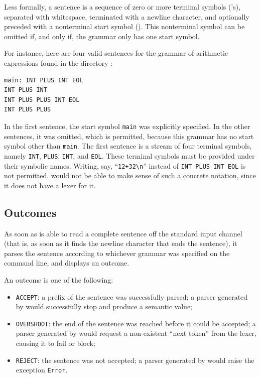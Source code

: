 \documentclass[onecolumn,11pt,nocopyrightspace,preprint]{sigplanconf}
\begin{document}
Less formally, a sentence is a sequence of zero or more terminal symbols
('s), separated with whitespace, terminated with a newline character,
and optionally preceded with a nonterminal start symbol (). This
nonterminal symbol can be omitted if, and only if, the grammar only has one
start symbol.

For instance, here are four valid sentences for the grammar of arithmetic
expressions found in the directory :
%
\begin{verbatim}
main: INT PLUS INT EOL
INT PLUS INT
INT PLUS PLUS INT EOL
INT PLUS PLUS
\end{verbatim}
%
In the first sentence, the start symbol \texttt{main} was explicitly
specified. In the other sentences, it was omitted, which is permitted, because
this grammar has no start symbol other than \texttt{main}.  The first sentence
is a stream of four terminal symbols, namely \texttt{INT}, \texttt{PLUS},
\texttt{INT}, and \texttt{EOL}. These terminal symbols must be provided under
their symbolic names. Writing, say, ``\texttt{12+32\textbackslash n}'' instead
of \texttt{INT PLUS INT EOL} is not permitted. \menhir would not be able to
make sense of such a concrete notation, since it does not have a lexer for it.


\subsection{Outcomes}
\label{sec:outcomes}

As soon as \menhir is able to read a complete sentence off the standard input
channel (that is, as soon as it finds the newline character that ends the
sentence), it parses the sentence according to whichever grammar was specified
on the command line, and displays an outcome.

An outcome is one of the following:
\begin{itemize}
\item \texttt{ACCEPT}: a prefix of the sentence was successfully parsed;
      a parser generated by \menhir would successfully stop and produce
      a semantic value;
\item \texttt{OVERSHOOT}: the end of the sentence was reached before it
      could be accepted; a parser generated by \menhir would request a
      non-existent ``next token'' from the lexer, causing it to fail or
      block;
\item \texttt{REJECT}: the sentence was not accepted; a parser generated
      by \menhir would raise the exception \texttt{Error}.
\end{itemize}
\end{document}
